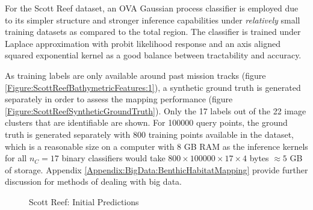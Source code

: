 		For the Scott Reef dataset, an OVA Gaussian process classifier is employed due to its simpler structure and stronger inference capabilities under \textit{relatively} small training datasets as compared to the total region. The classifier is trained under Laplace approximation with probit likelihood response and an axis aligned squared exponential kernel as a good balance between tractability and accuracy.

		As training labels are only available around past mission tracks (figure \ref{Figure:ScottReefBathymetricFeatures:1}), a synthetic ground truth is generated separately in order to assess the mapping performance (figure \ref{Figure:ScottReefSyntheticGroundTruth}). Only the 17 labels out of the 22 image clusters that are identifiable are shown. For 100000 query points, the ground truth is generated separately with 800 training points available in the dataset, which is a reasonable size on a computer with 8 GB RAM as the inference kernels for all $n_{C} = 17$ binary classifiers would take $800 \times 100000 \times 17 \times 4$ bytes $\approx 5$ GB of storage. Appendix \ref{Appendix:BigData:BenthicHabitatMapping} provide further discussion for methods of dealing with big data.
		

		\begin{figure}[!htbp]
		\centering
		\caption{Scott Reef: Initial Predictions}
		\label{Figure:ScottReefInitialPredictions}
		\end{figure}
		
